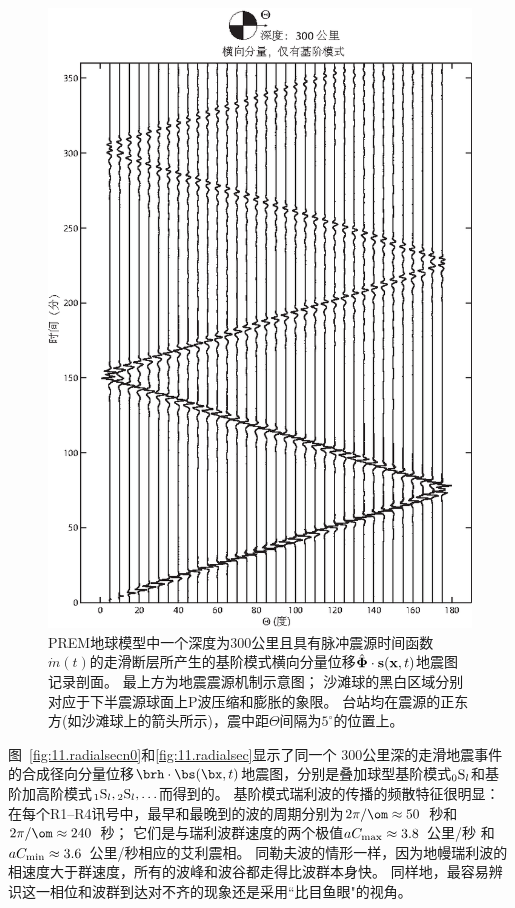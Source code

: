 \begin{figure}
\begin{center}
\includegraphics{../figures/chap11/fig10.eps}
\end{center}
\caption[transverse record sections n=0]{
\label{fig:11.transrecn0}
PREM地球模型中一个深度为300公里且具有脉冲震源时间函数$\dot{m}(t)$的走滑断层所产生的基阶模式横向分量位移$\hat{\bf \Phi}\cdot{\bf s}({\bf x},t)$地震图记录剖面。
最上方为地震震源机制示意图；
沙滩球的黑白区域分别对应于下半震源球面上P波压缩和膨胀的象限。
台站均在震源的正东方(如沙滩球上的箭头所示)，震中距$\Theta$间隔为$5^\circ$的位置上。
}
\end{figure}

图~\ref{fig:11.radialsecn0}和\ref{fig:11.radialsec}显示了同一个
300公里深的走滑地震事件的合成径向分量位移$\brh\cdot\bs(\bx,t)$地震图，分别是叠加球型基阶模式${}_0{\rm S}_l$和基阶加高阶模式${}_1{\rm S}_l,{}_2{\rm S}_l,\ldots$而得到的。
基阶模式瑞利波的传播的频散特征很明显：
在每个R1--R4讯号中，最早和最晚到的波的周期分别为$2\pi/\om\approx 50$~秒和$2\pi/\om\approx 240$~秒；
它们是与瑞利波群速度的两个极值$aC_{\rm max}\approx 3.8$~公里/秒
和$aC_{\rm min}\approx 3.6$~公里/秒相应的艾利震相。
同勒夫波的情形一样，因为地幔瑞利波的相速度大于群速度，所有的波峰和波谷都走得比波群本身快。
同样地，最容易辨识这一相位和波群到达对不齐的现象还是采用“比目鱼眼"的视角。

